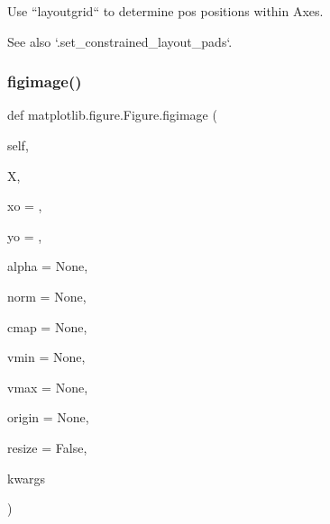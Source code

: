 \begin{DoxyVerb}Use ``layoutgrid`` to determine pos positions within Axes.

See also `.set_constrained_layout_pads`.
\end{DoxyVerb}
 \mbox{\label{classmatplotlib_1_1figure_1_1Figure_a4fbf405fa7586b7026a2e7e94e192c6d}} 
\subsubsection{\texorpdfstring{figimage()}{figimage()}}
{\footnotesize\ttfamily def matplotlib.\+figure.\+Figure.\+figimage (\begin{DoxyParamCaption}\item[{}]{self,  }\item[{}]{X,  }\item[{}]{xo = {},  }\item[{}]{yo = {},  }\item[{}]{alpha = {\ttfamily None},  }\item[{}]{norm = {\ttfamily None},  }\item[{}]{cmap = {\ttfamily None},  }\item[{}]{vmin = {\ttfamily None},  }\item[{}]{vmax = {\ttfamily None},  }\item[{}]{origin = {\ttfamily None},  }\item[{}]{resize = {\ttfamily False},  }\item[{}]{kwargs }\end{DoxyParamCaption})}

